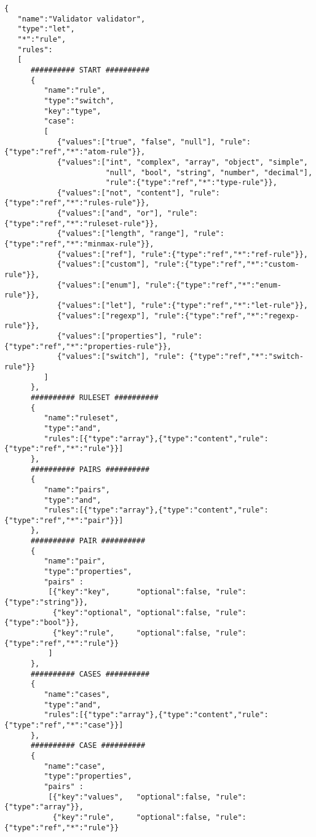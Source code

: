 \documentclass[a4paper]{article}
\begin{document}
\medskip
\begin{lstlisting}[basicstyle=\ttfamily\scriptsize{}]
{
   "name":"Validator validator",
   "type":"let",
   "*":"rule",
   "rules":
   [
      ########## START ##########
      {
         "name":"rule",
         "type":"switch",
         "key":"type",
         "case":
         [
            {"values":["true", "false", "null"], "rule":{"type":"ref","*":"atom-rule"}},
            {"values":["int", "complex", "array", "object", "simple",
                       "null", "bool", "string", "number", "decimal"],
                       "rule":{"type":"ref","*":"type-rule"}},
            {"values":["not", "content"], "rule":{"type":"ref","*":"rules-rule"}},
            {"values":["and", "or"], "rule":{"type":"ref","*":"ruleset-rule"}},
            {"values":["length", "range"], "rule":{"type":"ref","*":"minmax-rule"}},
            {"values":["ref"], "rule":{"type":"ref","*":"ref-rule"}},
            {"values":["custom"], "rule":{"type":"ref","*":"custom-rule"}},
            {"values":["enum"], "rule":{"type":"ref","*":"enum-rule"}},
            {"values":["let"], "rule":{"type":"ref","*":"let-rule"}},
            {"values":["regexp"], "rule":{"type":"ref","*":"regexp-rule"}},
            {"values":["properties"], "rule":{"type":"ref","*":"properties-rule"}},
            {"values":["switch"], "rule": {"type":"ref","*":"switch-rule"}}
         ]
      },
      ########## RULESET ##########
      {
         "name":"ruleset",
         "type":"and",
         "rules":[{"type":"array"},{"type":"content","rule":{"type":"ref","*":"rule"}}]
      },
      ########## PAIRS ##########
      {
         "name":"pairs",
         "type":"and",
         "rules":[{"type":"array"},{"type":"content","rule":{"type":"ref","*":"pair"}}]
      },
      ########## PAIR ##########
      {
         "name":"pair",
         "type":"properties",
         "pairs" :
          [{"key":"key",      "optional":false, "rule":{"type":"string"}},
           {"key":"optional", "optional":false, "rule":{"type":"bool"}},
           {"key":"rule",     "optional":false, "rule":{"type":"ref","*":"rule"}}
          ]
      },
      ########## CASES ##########
      {
         "name":"cases",
         "type":"and",
         "rules":[{"type":"array"},{"type":"content","rule":{"type":"ref","*":"case"}}]
      },
      ########## CASE ##########
      {
         "name":"case",
         "type":"properties",
         "pairs" :
          [{"key":"values",   "optional":false, "rule":{"type":"array"}},
           {"key":"rule",     "optional":false, "rule":{"type":"ref","*":"rule"}}

\end{lstlisting}
\end{document}
